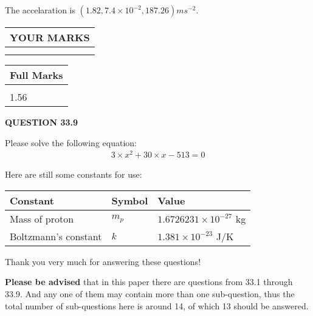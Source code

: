 \documentclass[12pt]{article}
\begin{document}
 
  The accelaration is $  %
(
1.82,
7.4 \times 10^{-2},
187.26)
ms^{-2} $.
 
 
 

 
 
\vspace{0.3in}
  
\vspace{0.2in}
  
\noindent\begin{tabular}{|l|}
\hline
 YOUR MARKS  \\
\hline
 \\ 
 \\ 
\hline
\end{tabular}
\hspace{0.05in} \begin{tabular}{|l|}
\hline
 Full Marks  \\
\hline
 \\ 
1.56 \\
\hline
\end{tabular}
{\textbf{\Large{QUESTION
33.9 
}}}
  
  
 
 

 
Please solve the following equation:
\begin{eqnarray*}
3 \times x^2  %
+  %
30
                 \times x    %
-513 =0
\end{eqnarray*}
 

 

 
\vspace{0.3in}
   
   
 \vspace{0.2in}
Here are still some constants for use:
 
 
\noindent\begin{tabular}{|l|l|l|}
\hline
Constant & Symbol & Value \\
\hline
 
Mass of proton &
$m_p$ &
 $ 1.6726231 \times 10^{-27} $
kg \\
\hline
 
Boltzmann's constant &
$k$ &
 $ 1.381 \times 10^{-23} $
J/K \\
\hline
 
\end{tabular}
 
Thank you very much for answering these questions!
 
{\textbf{\large{Please be advised}}} that in this paper there are questions from
33.1 through
33.9.
And any one of them may contain more than one sub-question, thus the total number
of sub-questions here is around 14, of which
13 should be answered.
 
\end{document}
